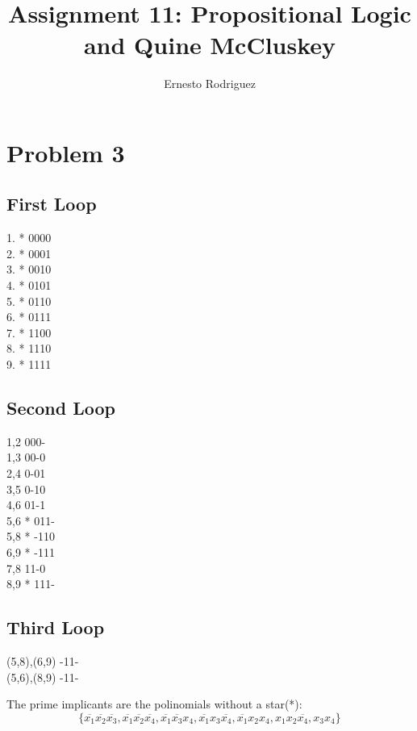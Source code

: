 \documentclass[11pt]{article}
\author{Ernesto Rodriguez}
\title{Assignment 11: Propositional Logic and Quine McCluskey}
\begin{document}
\maketitle

\section{Problem 3}

\begin{multicols}{3}
  
  \subsection{First Loop}
  1. * 0000 \\
  2. * 0001 \\
  3. * 0010 \\
  4. * 0101 \\
  5. * 0110 \\
  6. * 0111 \\
  7. * 1100 \\
  8. * 1110 \\
  9. * 1111 \\
  \subsection{Second Loop}
  1,2 000-\\
  1,3 00-0\\
  2,4 0-01\\
  3,5 0-10\\
  4,6 01-1\\
  5,6 * 011-\\
  5,8 * -110\\
  6,9 * -111\\
  7,8 11-0\\
  8,9 * 111-
  \subsection{Third Loop}
  (5,8),(6,9) -11-\\
  (5,6),(8,9) -11-\\
\end{multicols}

The prime implicants are the polinomials without a star(*):
\[\{\overline{x_1}\overline{x_2}\overline{x_3},\overline{x_1}\overline{x_2}\overline{x_4},\overline{x_1}\overline{x_3}x_4,\overline{x_1}x_3\overline{x_4},\overline{x_1}x_2x_4,x_1x_2\overline{x_4},x_3x_4\}
\]
\end{document}
